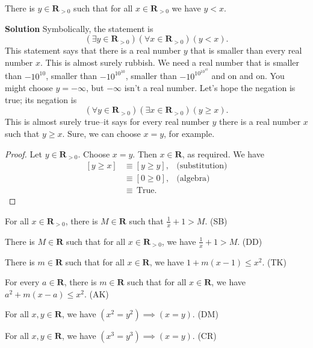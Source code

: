 \documentclass[12pt,fleqn,answers]{exam}
\newcommand{\reals}{\mathbf{R}}
\newcommand{\true}{\, \mathrm{True}}
\newenvironment{myproof}
  {\begin{shaded}\begin{proof}}
  {\end{proof}\end{shaded}}
\begin{document}
\begin{questions}
      
     \question There is $y \in \reals_{> 0}$ such that for all $x \in \reals_{>0}$ we have $y < x$.
       
        \textbf{Solution}  Symbolically, the statement is
       \begin{equation*}
         \left(\exists y \in \reals_{>0}\right)\left(\forall x \in \reals_{>0}\right) \left(y < x \right).
       \end{equation*}
       This statement says that there is a real number $y$ that is smaller than every real number $x$. This
       is almost surely rubbish. We need a real number that is smaller than $-10^{10}$, smaller than $-10^{10^{10}}$,
       smaller than $-10^{10^{10^{10}}}$ and on and on.  You might choose $y=-\infty$, but $-\infty$ isn't a real number.
       Let's hope the negation is true; its negation is
       \begin{equation*}
         \left(\forall y \in \reals_{>0}\right)\left(\exists x \in \reals_{>0}\right) \left(y \geq  x \right).
       \end{equation*}
       This is almost surely true--it says for every real number $y$ there is a real number $x$ such that
       $y \geq x$.    Sure, we can choose $x = y$, for example.
       
       \begin{myproof} Let $y \in \reals_{>0}$. Choose $x = y$. Then $x \in \reals$, as required. We have
       \begin{align*}
         \left[y \geq x  \right] &\equiv \left[y \geq  y \right], & \mbox{(substitution)} \\
                                      &\equiv \left[0 \geq 0 \right], &\mbox{(algebra)} \\
                                      &\equiv \true.
       \end{align*}
       
       \end{myproof}
       
    \question For all $x \in \reals_{>0}$, there is $M \in \reals$ such
     that $\frac{1}{x} +1 > M$. \hfill (SB)

         \question There is $M \in \reals$ such that for all $x \in \reals_{>0}$,
     we have $\frac{1}{x} + 1 > M$. \hfill (DD) 

     \question  There is $m \in \reals$ such that for all $x \in \reals$, we 
     have $1 + m(x-1) \leq x^2$. \hfill (TK)

     \question  For every $a \in \reals$, there is $m \in \reals$ such 
     that for all $x \in \reals$, we have $a^2 + m(x-a) \leq x^2$. \hfill (AK)

     \question For all $x,y \in \reals$, we have $(x^2 = y^2) \implies (x=y)$. 
     \hfill (DM) 

    \question For all $x,y \in \reals$, we have $(x^3 = y^3) \implies (x=y)$. 
    \hfill (CR) 


\end{questions}
\end{document}
